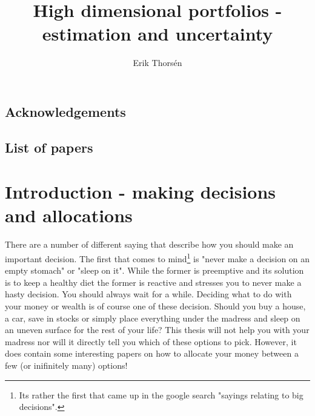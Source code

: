 \documentclass[]{book}
\title{High dimensional portfolios - estimation and uncertainty}
\author{Erik Thorsén}
\begin{document}
\maketitle

\section*{Acknowledgements}

\newpage
\section*{List of papers}

\tableofcontents
\chapter[Introduction]{Introduction - making decisions and allocations}\label{ch:intro}
There are a number of different saying that describe how you should make an important decision. The first that comes to mind\footnote{Its rather the first that came up in the google search "sayings relating to big decisions".} is "never make a decision on an empty stomach" or "sleep on it". 
While the former is preemptive and its solution is to keep a healthy diet the former is reactive and stresses you to never make a hasty decision. You should always wait for a while. Deciding what to do with your money or wealth is of course one of these decision. Should you buy a house, a car, save in stocks or simply place everything under the madress and sleep on an uneven surface for the rest of your life? This thesis will not help you with your madress nor will it directly tell you which of these options to pick. However, it does contain some interesting papers on how to allocate your money between a few (or inifinitely many) options!
\end{document}
